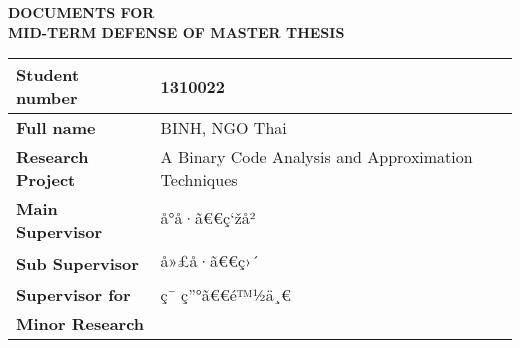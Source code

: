 \documentclass{article}
\begin{document}
\Large
\begin{center}
{\LARGE\bf DOCUMENTS FOR \\MID-TERM DEFENSE OF MASTER THESIS}
\end{center}

\vspace{10mm}

\begin{tabular}{| p{43mm} | p{12cm} | }
\hline

{\bf Student number} &  \hspace{4.7cm} 1310022 \\
\hline
{\bf Full name} &  \hspace{3.5cm} BINH, NGO Thai \\
\hline
\hline

{\bf Research Project} & A Binary Code Analysis and Approximation Techniques \\
\hline
{\bf Main Supervisor} & \hspace{4.5cm} å°å·ã€€ç‘žå²\\
\hline
{\bf Sub Supervisor} &  \hspace{4.5cm} å»£å·ã€€ç›´ \\
\hline
{\bf Supervisor for }&  \hspace{4.5cm} ç¯ ç”°ã€€é™½ä¸€\\
{\vspace{-7mm} \bf Minor Research} &  \\ 
\hline
\end{tabular}
\end{document}
